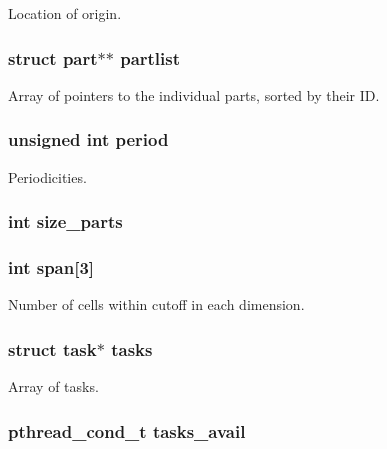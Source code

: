 Location of origin. \hypertarget{structspace_acbc3d878bac5d0776f53e8f208d143f6}{
\subsubsection[{partlist}]{\setlength{\rightskip}{0pt plus 5cm}struct {\bf part}$\ast$$\ast$ partlist}}\label{structspace_acbc3d878bac5d0776f53e8f208d143f6}
Array of pointers to the individual parts, sorted by their I\-D. \hypertarget{structspace_a528ce5558d238708bc2cb7e5a71ad961}{
\subsubsection[{period}]{\setlength{\rightskip}{0pt plus 5cm}unsigned int period}}\label{structspace_a528ce5558d238708bc2cb7e5a71ad961}
Periodicities. \hypertarget{structspace_a40717ee7b6746d1305b707e53b83665e}{
\subsubsection[{size\-\_\-parts}]{\setlength{\rightskip}{0pt plus 5cm}int size\-\_\-parts}}\label{structspace_a40717ee7b6746d1305b707e53b83665e}
\hypertarget{structspace_adf1e7911214d724d3d08b3c46e6a6a7a}{
\subsubsection[{span}]{\setlength{\rightskip}{0pt plus 5cm}int span\mbox{[}3\mbox{]}}}\label{structspace_adf1e7911214d724d3d08b3c46e6a6a7a}
Number of cells within cutoff in each dimension. \hypertarget{structspace_ace3a87c7e253bce95072d59dfcb2622f}{
\subsubsection[{tasks}]{\setlength{\rightskip}{0pt plus 5cm}struct {\bf task}$\ast$ tasks}}\label{structspace_ace3a87c7e253bce95072d59dfcb2622f}
Array of tasks. \hypertarget{structspace_aed87af14b8cd94b2bbc6ce0e3f6b489f}{
\subsubsection[{tasks\-\_\-avail}]{\setlength{\rightskip}{0pt plus 5cm}pthread\-\_\-cond\-\_\-t tasks\-\_\-avail}}\label{structspace_aed87af14b8cd94b2bbc6ce0e3f6b489f}

